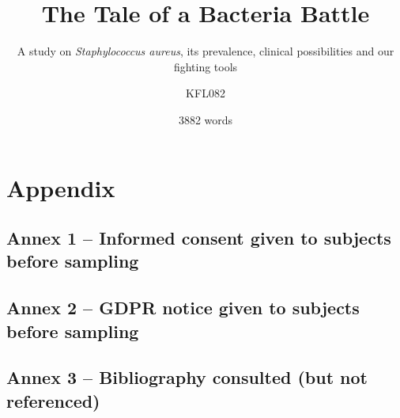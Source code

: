 \documentclass[fontsize=12pt,twoside=semi,openright,numbers=noenddot,parskip=half]{scrbook}
\title{The Tale of a Bacteria Battle}
\subtitle{A study on \emph{Staphylococcus aureus}, its prevalence, clinical possibilities and our fighting tools}
\author{KFL082}
\date{3882 words}
\begin{document}
\maketitle
\cleardoublepage
\renewcommand{\thepage}{\arabic{page}}
\frontmatter
\mainmatter\printindex\tableofcontents



%

\backmatter
\renewcommand{\thepage}{\Roman{page}}\setcounter{page}{0}
\clearpage
\printbibliography[title={Works referenced}]
\part{Appendix}\appendix
\chapter{Annex 1 – Informed consent given to subjects before sampling}

\clearpage\appendix\chapter{Annex 2 – GDPR notice given to subjects before sampling}

\chapter{Annex 3 – Bibliography consulted (but not referenced)}

\end{document}
